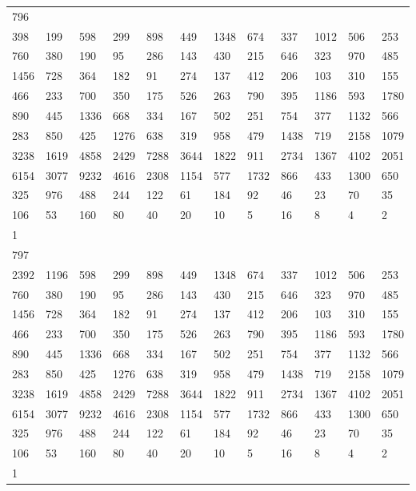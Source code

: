 \begin{longtable}{llllllllllll}
796&&&&&&&&&&&\\
398& 199& 598& 299& 898& 449& 1348& 674& 337& 1012& 506& 253\\
760& 380& 190& 95& 286& 143& 430& 215& 646& 323& 970& 485\\
1456& 728& 364& 182& 91& 274& 137& 412& 206& 103& 310& 155\\
466& 233& 700& 350& 175& 526& 263& 790& 395& 1186& 593& 1780\\
890& 445& 1336& 668& 334& 167& 502& 251& 754& 377& 1132& 566\\
283& 850& 425& 1276& 638& 319& 958& 479& 1438& 719& 2158& 1079\\
3238& 1619& 4858& 2429& 7288& 3644& 1822& 911& 2734& 1367& 4102& 2051\\
6154& 3077& 9232& 4616& 2308& 1154& 577& 1732& 866& 433& 1300& 650\\
325& 976& 488& 244& 122& 61& 184& 92& 46& 23& 70& 35\\
106& 53& 160& 80& 40& 20& 10& 5& 16& 8& 4& 2\\
1& \\

797&&&&&&&&&&&\\
2392& 1196& 598& 299& 898& 449& 1348& 674& 337& 1012& 506& 253\\
760& 380& 190& 95& 286& 143& 430& 215& 646& 323& 970& 485\\
1456& 728& 364& 182& 91& 274& 137& 412& 206& 103& 310& 155\\
466& 233& 700& 350& 175& 526& 263& 790& 395& 1186& 593& 1780\\
890& 445& 1336& 668& 334& 167& 502& 251& 754& 377& 1132& 566\\
283& 850& 425& 1276& 638& 319& 958& 479& 1438& 719& 2158& 1079\\
3238& 1619& 4858& 2429& 7288& 3644& 1822& 911& 2734& 1367& 4102& 2051\\
6154& 3077& 9232& 4616& 2308& 1154& 577& 1732& 866& 433& 1300& 650\\
325& 976& 488& 244& 122& 61& 184& 92& 46& 23& 70& 35\\
106& 53& 160& 80& 40& 20& 10& 5& 16& 8& 4& 2\\
1& \\


\end{longtable}
